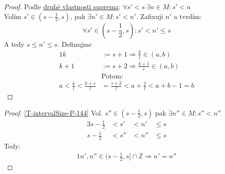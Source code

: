 \begin{proof}
	Podle \hyperref[D-supremum-2]{druhé vlastnosti suprema}: $\forall s'<s~\exists n\in M:s'<n$ \\
	Volím $s'\in\left(s-\frac{1}{2},s\right)$, pak $\exists n'\in M: s'<n'$. Zafixuji $n'$ a tvrdím:
	\begin{equation}\label{T-intervalSize-P-144}
		\forall s'\in (s-\frac{1}{2},s): s'<n'\leq s
	\end{equation}
	A tedy $s\leq n'\leq s$. Definujme
	\begin{alignat}{1}
		k&:=s+1 \Rightarrow \frac{k}{l}\in (a,b) \\
		k+1&:=s+2 \Rightarrow \frac{k+1}{l}\in (a,b) \\
		&\text{Potom:} \nonumber\\
		a<\frac{k}{l}<\frac{k+s}{l}&=\frac{s+2}{l}<a+\frac{2}{l}<a+b-1=b  %
	\end{alignat}
\end{proof}

\begin{proof}
	\autoref{T-intervalSize-P-144} Vol. $s''\in (s-\frac{1}{2},s)$ pak $\exists n''\in M: s''<n''$
	\begin{alignat}{3}
		s-\frac{1}{2}&<s'&<n'&\leq s \\
		s-\frac{1}{2}&<s''&<n''&\leq s
	\end{alignat}
	Tedy:
	\begin{alignat}{1}
		n',n'' \in (s-\frac{1}{2},s]\cap\mathbb{Z}\Rightarrow n'=n''
	\end{alignat}
\end{proof}
